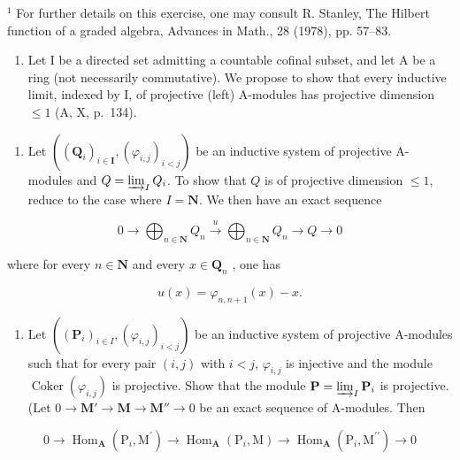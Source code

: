 \(^{1}\) For further details on this exercise, one may consult R. Stanley, The Hilbert function of a graded algebra, Advances in Math., 28 (1978), pp. 57–83.

\begin{enumerate}
\def\labelenumi{\arabic{enumi})}
\setcounter{enumi}{6}
\tightlist
\item
  Let I be a directed set admitting a countable cofinal subset, and let A be a ring (not necessarily commutative). We propose to show that every inductive limit, indexed by I, of projective (left) A-modules has projective dimension \(\leqslant 1\) (A, X, p.~134).
\end{enumerate}

\begin{enumerate}
\def\labelenumi{\alph{enumi})}
\tightlist
\item
  Let \(((\mathbf{Q}_i)_{i\in \mathbf{I}},(\varphi_{i,j})_{i < j})\) be an inductive system of projective A-modules and \(Q = \varinjlim_{I} Q_i\). To show that \(Q\) is of projective dimension \(\leqslant 1\), reduce to the case where \(I = \mathbf{N}\). We then have an exact sequence
\end{enumerate}

\[
0 \longrightarrow \bigoplus_ {n \in \mathbf {N}} Q _ {n} \stackrel {u} {\longrightarrow} \bigoplus_ {n \in \mathbf {N}} Q _ {n} \longrightarrow Q \longrightarrow 0
\]

where for every \(n \in \mathbf{N}\) and every \(x \in \mathbf{Q}_n\) , one has

\[
u (x) = \varphi_ {n, n + 1} (x) - x.
\]

\begin{enumerate}
\def\labelenumi{\alph{enumi})}
\setcounter{enumi}{1}
\tightlist
\item
  Let \(((\mathbf{P}_i)_{i\in I}, (\varphi_{i,j})_{i < j})\) be an inductive system of projective A-modules such that for every pair \((i,j)\) with \(i < j\), \(\varphi_{i,j}\) is injective and the module \(\operatorname{Coker}(\varphi_{i,j})\) is projective. Show that the module \(\mathbf{P} = \varinjlim_{I} \mathbf{P}_i\) is projective. (Let \(0 \to \mathbf{M}' \to \mathbf{M} \to \mathbf{M}'' \to 0\) be an exact sequence of A-modules. Then
\end{enumerate}

\[
0 \to \operatorname{Hom} _ {\mathbf {A}} (\mathrm{P} _ {i}, \mathrm{M} ^ {\prime}) \to \operatorname{Hom} _ {\mathbf {A}} (\mathrm{P} _ {i}, \mathrm{M}) \to \operatorname{Hom} _ {\mathbf {A}} (\mathrm{P} _ {i}, \mathrm{M} ^ {\prime \prime}) \to 0
\]

